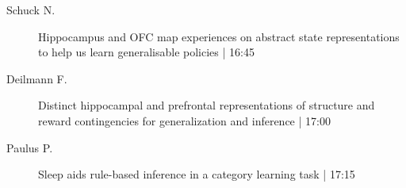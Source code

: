 \begin{symposium}
\begin{description}
                \item [ Schuck N.] Hippocampus and OFC map experiences on abstract state representations to help us learn generalisable policies \textcolor{mygray}{ | 16:45}    
                
                \item [ Deilmann F.] Distinct hippocampal and prefrontal representations of structure and reward contingencies for generalization and inference \textcolor{mygray}{ | 17:00}    
                
                \item [ Paulus P.] Sleep aids rule-based inference in a category learning task \textcolor{mygray}{ | 17:15}    
                
            \end{description} 
            \end{symposium}
            